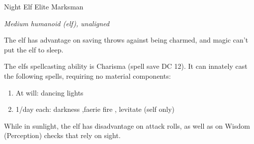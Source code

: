 \documentclass[letterpaper,10pt,twoside,twocolumn,openany]{book}
\begin{document}
\begin{monsterbox}{Night Elf Elite Marksman}
	\begin{hangingpar}
		\textit{Medium humanoid (elf), unaligned}
	\end{hangingpar}
	\dndline%
	\basics[%
	armorclass = 18,
	hitpoints  = 71,
	speed      = 30 ft
	]
	\dndline%
	\stats[
	STR = \stat{12}, %
	DEX = \stat{19},
	CON = \stat{14},
	INT = \stat{11},
	WIS = \stat{13},
	CHA = \stat{13}
	]
	\dndline%
	\details[%
	savingthrows = {Dex +7, Con +5, Wis +4},
	skills = {Perception +4, Stealth +10},
	senses = {darkvision 120 ft., passive perception 14},
	languages = {Elvish, undercommon, common},
	challenge = 5 (1800 XP)
	]
	\dndline%
	\begin{monsteraction}
		The elf has advantage on saving throws against being charmed, and magic can't put the elf to sleep.
	\end{monsteraction}	
	\begin{monsteraction}
		The elfs spellcasting ability is Charisma (spell save DC 12). It can innately cast the following spells, requiring no material components:
		\begin{enumerate}
			\item At will: dancing lights
			\item 1/day each: darkness ,faerie fire , levitate (self only)
		\end{enumerate}
	\end{monsteraction}	
	\begin{monsteraction}
		While in sunlight, the elf has disadvantage on attack rolls, as well as on Wisdom (Perception) checks that rely on sight.
	\end{monsteraction}	
	

\end{monsterbox}
\end{document}
